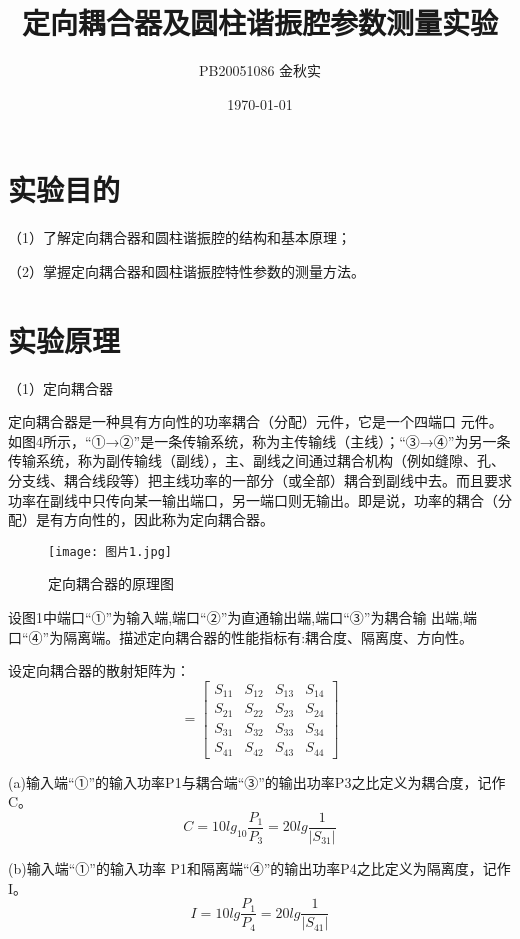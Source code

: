\documentclass[UTF8]{ctexart}
\title{定向耦合器及圆柱谐振腔参数测量实验}
\author{PB20051086 金秋实}
\date{\today}
\begin{document}
\maketitle
\section{实验目的}
（1）了解定向耦合器和圆柱谐振腔的结构和基本原理；

（2）掌握定向耦合器和圆柱谐振腔特性参数的测量方法。 
\section{实验原理}
（1）定向耦合器

定向耦合器是一种具有方向性的功率耦合（分配）元件，它是一个四端口 元件。如图4所示，“①→②”是一条传输系统，称为主传输线（主线）；“③→④”为另一条传输系统，称为副传输线（副线），主、副线之间通过耦合机构（例如缝隙、孔、分支线、耦合线段等）把主线功率的一部分（或全部）耦合到副线中去。而且要求功率在副线中只传向某一输出端口，另一端口则无输出。即是说，功率的耦合（分配）是有方向性的，因此称为定向耦合器。
\begin{figure}[!htp]
    \centering
    \texttt{[image: 图片1.jpg]}
    \caption{定向耦合器的原理图}
\end{figure}

设图1中端口“①”为输入端,端口“②”为直通输出端,端口“③”为耦合输 出端,端口“④”为隔离端。描述定向耦合器的性能指标有:耦合度、隔离度、方向性。

设定向耦合器的散射矩阵为：
\begin{equation}
    [S] = 
    \begin{bmatrix}
        S_{11} & S_{12} & S_{13} & S_{14} \\
        S_{21} & S_{22} & S_{23} & S_{24} \\
        S_{31} & S_{32} & S_{33} & S_{34} \\
        S_{41} & S_{42} & S_{43} & S_{44}
    \end{bmatrix}
\end{equation}

(a)输入端“①”的输入功率P1与耦合端“③”的输出功率P3之比定义为耦合度，记作C。
\begin{equation}
    C = 10lg_{10}\frac{P_1}{P_3}= 20 lg \frac{1}{|S_{31}|}
\end{equation}

(b)输入端“①”的输入功率 P1和隔离端“④”的输出功率P4之比定义为隔离度，记作I。
\begin{equation}
    I = 10 lg\frac{P_1}{P_4} = 20 lg \frac{1}{|S_{41}|}
\end{equation}
\end{document}
